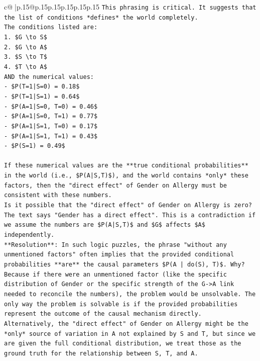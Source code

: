 \documentclass{article}
\begin{document}
{\begin{supertabular}{c@{$\;$}|p{.15\linewidth}@{}p{.15\linewidth}p{.15\linewidth}p{.15\linewidth}p{.15\linewidth}p{.15\linewidth}}
{{{\texttt{This phrasing is critical. It suggests that the list of conditions *defines* the world completely.} \\
\texttt{The conditions listed are:} \\
\texttt{1. \$G \textbackslash{}to S\$} \\
\texttt{2. \$G \textbackslash{}to A\$} \\
\texttt{3. \$S \textbackslash{}to T\$} \\
\texttt{4. \$T \textbackslash{}to A\$} \\
\texttt{AND the numerical values:} \\
\texttt{{-} \$P(T=1|S=0) = 0.18\$} \\
\texttt{{-} \$P(T=1|S=1) = 0.64\$} \\
\texttt{{-} \$P(A=1|S=0, T=0) = 0.46\$} \\
\texttt{{-} \$P(A=1|S=0, T=1) = 0.77\$} \\
\texttt{{-} \$P(A=1|S=1, T=0) = 0.17\$} \\
\texttt{{-} \$P(A=1|S=1, T=1) = 0.43\$} \\
\texttt{{-} \$P(S=1) = 0.49\$} \\
\\ 
\texttt{If these numerical values are the **true conditional probabilities** in the world (i.e., \$P(A|S,T)\$), and the world contains *only* these factors, then the "direct effect" of Gender on Allergy must be consistent with these numbers.} \\
\texttt{Is it possible that the "direct effect" of Gender on Allergy is zero? The text says "Gender has a direct effect". This is a contradiction if we assume the numbers are \$P(A|S,T)\$ and \$G\$ affects \$A\$ independently.} \\
\texttt{**Resolution**: In such logic puzzles, the phrase "without any unmentioned factors" often implies that the provided conditional probabilities **are** the causal parameters \$P(A | do(S), T)\$. Why? Because if there were an unmentioned factor (like the specific distribution of Gender or the specific strength of the G{-}>A link needed to reconcile the numbers), the problem would be unsolvable. The only way the problem is solvable is if the provided probabilities represent the outcome of the causal mechanism directly.} \\
\texttt{Alternatively, the "direct effect" of Gender on Allergy might be the *only* source of variation in A not explained by S and T, but since we are given the full conditional distribution, we treat those as the ground truth for the relationship between S, T, and A.} \\
}}}
\end{supertabular}}
\end{document}
